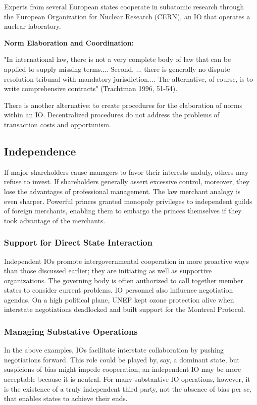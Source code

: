 Experts from several European states cooperate in subatomic research through the European Organization for Nuclear Research (CERN), an IO that operates a nuclear laboratory.

\textbf{Norm Elaboration and Coordination:}

"In international law, there is not a very complete body of law that can be applied to supply missing terms.... Second, ... there is generally no dispute resolution tribunal with mandatory jurisdiction.... The alternative, of course, is to write comprehensive contracts" (Trachtman 1996, 51-54).

There is another alternative: to create procedures for the elaboration of norms within an IO. Decentralized procedures do not address the problems of transaction costs and opportunism.

\subsection{Independence}
If major shareholders cause managers to favor their interests unduly, others may refuse to invest. If shareholders generally assert excessive control, moreover, they lose the advantages of professional management. The law merchant analogy is even sharper. Powerful princes granted monopoly privileges to independent guilds of foreign merchants, enabling them to embargo the princes themselves if they took advantage of the merchants.

\subsubsection{Support for Direct State Interaction}
Independent IOs promote intergovernmental cooperation in more proactive ways than those discussed earlier; they are initiating as well as supportive organizations. The governing body is often authorized to call together member states to consider current problems. IO personnel also influence negotiation agendas. On a high political plane, UNEP kept ozone protection alive when interstate negotiations deadlocked and built support for the Montreal Protocol.

\subsubsection{Managing Substative Operations}
In the above examples, IOs facilitate interstate collaboration by pushing negotiations forward. This role could be played by, say, a dominant state, but suspicions of bias might impede cooperation; an independent IO may be more acceptable because it is neutral. For many substantive IO operations, however, it is the existence of a truly independent third party, not the absence of bias per se, that enables states to achieve their ends.

